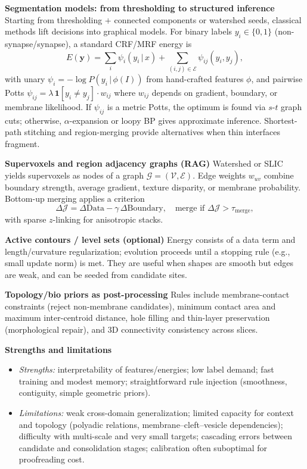\medskip
\noindent\textbf{Segmentation models: from thresholding to structured inference}\;
Starting from thresholding \(+\) connected components or watershed seeds, classical methods lift decisions into graphical models.
For binary labels \(y_i\in\{0,1\}\) (non-synapse/synapse), a standard CRF/MRF energy is
\[
E(\mathbf y)=\sum_i \psi_i(y_i\,|\,x)+\sum_{(i,j)\in\mathcal E}\psi_{ij}(y_i,y_j),
\]
with unary \(\psi_i=-\log P(y_i\,|\,\phi(I))\) from hand-crafted features \(\phi\),
and pairwise Potts \(\psi_{ij}=\lambda\,\mathbf 1[y_i\neq y_j]\cdot w_{ij}\) where \(w_{ij}\) depends on gradient, boundary, or membrane likelihood.
If \(\psi_{ij}\) is a metric Potts, the optimum is found via \(s\)-\(t\) graph cuts; otherwise, \(\alpha\)-expansion or loopy BP gives approximate inference.
Shortest-path stitching and region-merging provide alternatives when thin interfaces fragment.

\medskip
\noindent\textbf{Supervoxels and region adjacency graphs (RAG)}\;
Watershed or SLIC yields supervoxels as nodes of a graph \(\mathcal G=(\mathcal V,\mathcal E)\).
Edge weights \(w_{uv}\) combine boundary strength, average gradient, texture disparity, or membrane probability.
Bottom-up merging applies a criterion
\[
\Delta \mathcal J=\Delta\mathrm{Data}-\gamma\,\Delta\mathrm{Boundary},
\quad \text{merge if }\Delta \mathcal J>\tau_{\text{merge}},
\]
with sparse \(z\)-linking for anisotropic stacks.

\medskip
\noindent\textbf{Active contours / level sets (optional)}\;
Energy consists of a data term and length/curvature regularization; evolution proceeds until a stopping rule (e.g., small update norm) is met.
They are useful when shapes are smooth but edges are weak, and can be seeded from candidate sites.

\medskip
\noindent\textbf{Topology/bio priors as post-processing}\;
Rules include membrane-contact constraints (reject non-membrane candidates), minimum contact area and maximum inter-centroid distance, hole filling and thin-layer preservation (morphological repair), and 3D connectivity consistency across slices.

\medskip
\noindent\textbf{Strengths and limitations}\;
\begin{itemize}\setlength\itemsep{0.25em}
  \item \emph{Strengths:} interpretability of features/energies; low label demand; fast training and modest memory; straightforward rule injection (smoothness, contiguity, simple geometric priors).
  \item \emph{Limitations:} weak cross-domain generalization; limited capacity for context and topology (polyadic relations, membrane–cleft–vesicle dependencies); difficulty with multi-scale and very small targets; cascading errors between candidate and consolidation stages; calibration often suboptimal for proofreading cost.
\end{itemize}


